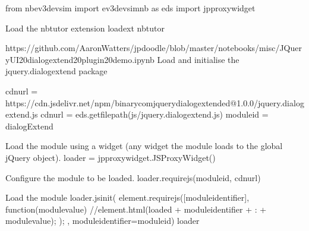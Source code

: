 \documentclass[letterpaper,10pt,english]{sphinxmanual}
\begin{document}
{
\begin{sphinxVerbatim}[commandchars=\\\{\}]
\llap{\color{nbsphinxin}[ ]:\,\hspace{\fboxrule}\hspace{\fboxsep}}from nbev3devsim import ev3devsim\PYGZus{}nb as eds
import jp\PYGZus{}proxy\PYGZus{}widget

\PYGZsh{}Load the nbtutor extension
\PYGZpc{}load\PYGZus{}ext nbtutor

\PYGZsh{}https://github.com/AaronWatters/jp\PYGZus{}doodle/blob/master/notebooks/misc/JQueryUI\PYGZpc{}20dialogextend\PYGZpc{}20plugin\PYGZpc{}20demo.ipynb
\PYGZsh{}Load and initialise the jquery.dialogextend package

cdn\PYGZus{}url = \PYGZdq{}https://cdn.jsdelivr.net/npm/binary\PYGZhy{}com\PYGZhy{}jquery\PYGZhy{}dialogextended@1.0.0/jquery.dialogextend.js\PYGZdq{}
cdn\PYGZus{}url = eds.get\PYGZus{}file\PYGZus{}path(\PYGZsq{}js/jquery.dialogextend.js\PYGZsq{})
module\PYGZus{}id = \PYGZdq{}dialogExtend\PYGZdq{}

\PYGZsh{} Load the module using a widget (any widget \PYGZhy{}\PYGZhy{} the module loads to the global jQuery object).
loader = jp\PYGZus{}proxy\PYGZus{}widget.JSProxyWidget()

\PYGZsh{} Configure the module to be loaded.
loader.require\PYGZus{}js(module\PYGZus{}id, cdn\PYGZus{}url)

\PYGZsh{} Load the module
loader.js\PYGZus{}init(\PYGZdq{}\PYGZdq{}\PYGZdq{}
    element.requirejs([module\PYGZus{}identifier], function(module\PYGZus{}value) \PYGZob{}
        //element.html(\PYGZdq{}loaded \PYGZdq{} + module\PYGZus{}identifier + \PYGZdq{} : \PYGZdq{} + module\PYGZus{}value);
    \PYGZcb{});
\PYGZdq{}\PYGZdq{}\PYGZdq{}, module\PYGZus{}identifier=module\PYGZus{}id)
loader

\end{sphinxVerbatim}
}
\end{document}
